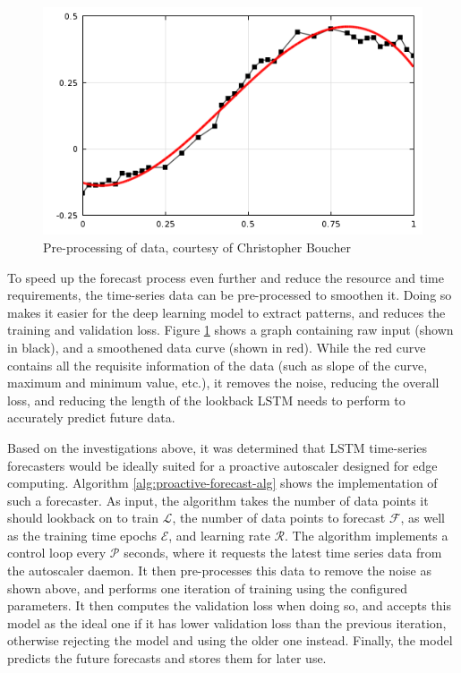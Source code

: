 \begin{figure}[htb]
    \centering
    \caption{Pre-processing of data, courtesy of Christopher Boucher \cite{comsolcurvefitting}}
    \label{fig:data-pre-process}
    \includegraphics[width=0.6\linewidth]{Figures/Data-Pre-Processing.png}
\end{figure}

To speed up the forecast process even further and reduce the resource and time requirements, the time-series data can be pre-processed to smoothen it. Doing so makes it easier for the deep learning model to extract patterns, and reduces the training and validation loss. Figure \ref{fig:data-pre-process} shows a graph containing raw input (shown in black), and a smoothened data curve (shown in red). While the red curve contains all the requisite information of the data (such as slope of the curve, maximum and minimum value, etc.), it removes the noise, reducing the overall loss, and reducing the length of the lookback LSTM needs to perform to accurately predict future data.\par

Based on the investigations above, it was determined that LSTM time-series forecasters would be ideally suited for a proactive autoscaler designed for edge computing. Algorithm \ref{alg:proactive-forecast-alg} shows the implementation of such a forecaster. As input, the algorithm takes the number of data points it should lookback on to train $\mathcal{L}$, the number of data points to forecast $\mathcal{F}$, as well as the training time epochs $\mathcal{E}$, and learning rate $\mathcal{R}$. The algorithm implements a control loop every $\mathcal{P}$ seconds, where it requests the latest time series data from the autoscaler daemon. It then pre-processes this data to remove the noise as shown above, and performs one iteration of training using the configured parameters. It then computes the validation loss when doing so, and accepts this model as the ideal one if it has lower validation loss than the previous iteration, otherwise rejecting the model and using the older one instead. Finally, the model predicts the future forecasts and stores them for later use.\par

